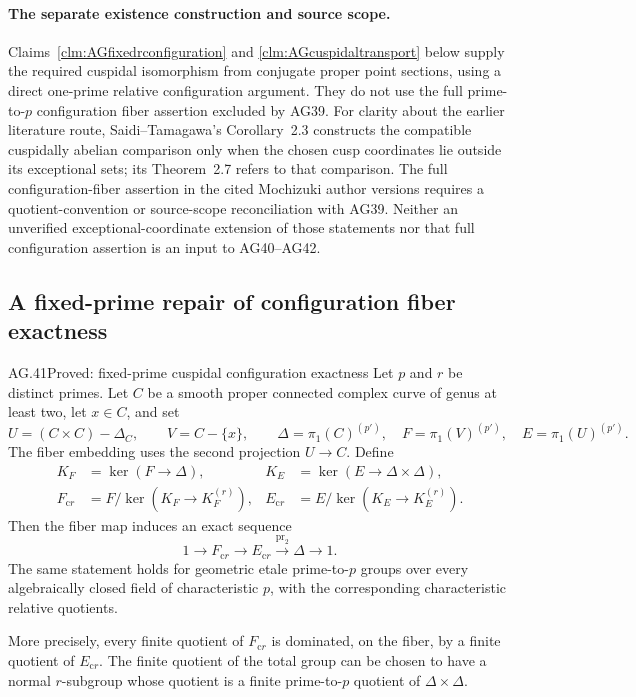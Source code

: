 \paragraph{The separate existence construction and source scope.}
Claims~\ref{clm:AGfixedrconfiguration} and
\ref{clm:AGcuspidaltransport} below supply the required
cuspidal isomorphism from conjugate proper point sections,
using a direct one-prime relative configuration argument.
They do not use the full prime-to-\(p\) configuration
fiber assertion excluded by AG39.
For clarity about the earlier literature route,
Saidi--Tamagawa's Corollary~2.3 constructs the compatible
cuspidally abelian comparison only when the chosen cusp
coordinates lie outside its exceptional sets; its
Theorem~2.7 refers to that comparison. The full
configuration-fiber assertion in the cited Mochizuki
author versions requires a quotient-convention or
source-scope reconciliation with AG39. Neither an
unverified exceptional-coordinate extension of those
statements nor that full configuration assertion is an
input to AG40--AG42.


\subsection{A fixed-prime repair of configuration fiber exactness}

\begin{claim}{AG.41}{Proved: fixed-prime cuspidal configuration exactness}
\label{clm:AGfixedrconfiguration}
Let \(p\) and \(r\) be distinct primes. Let \(C\) be a
smooth proper connected complex curve of genus at least two,
let \(x\in C\), and set
\[
 U=(C\times C)-\Delta_C,\qquad V=C-\{x\},\qquad
 \Delta=\pi_1(C)^{(p')},\quad F=\pi_1(V)^{(p')},\quad
 E=\pi_1(U)^{(p')}.
                                                        \tag{AG.41.1}
\]
The fiber embedding uses the second projection \(U\to C\).
Define
\[
\begin{aligned}
 K_F&=\ker(F\to\Delta),
 &K_E&=\ker(E\to\Delta\times\Delta),\\
 F_{\mathrm{c}r}&=F/\ker(K_F\to K_F^{(r)}),
 &E_{\mathrm{c}r}&=E/\ker(K_E\to K_E^{(r)}).
\end{aligned}
                                                        \tag{AG.41.2}
\]
Then the fiber map induces an exact sequence
\[
 1\longrightarrow F_{\mathrm{c}r}
 \longrightarrow E_{\mathrm{c}r}
 \xrightarrow{\mathrm{pr}_2}\Delta\longrightarrow1.
                                                        \tag{AG.41.3}
\]
The same statement holds for geometric etale prime-to-\(p\)
groups over every algebraically closed field of characteristic
\(p\), with the corresponding characteristic relative quotients.

More precisely, every finite quotient of \(F_{\mathrm{c}r}\)
is dominated, on the fiber, by a finite quotient of
\(E_{\mathrm{c}r}\). The finite quotient of the total group
can be chosen to have a normal \(r\)-subgroup whose quotient
is a finite prime-to-\(p\) quotient of
\(\Delta\times\Delta\).
\end{claim}

